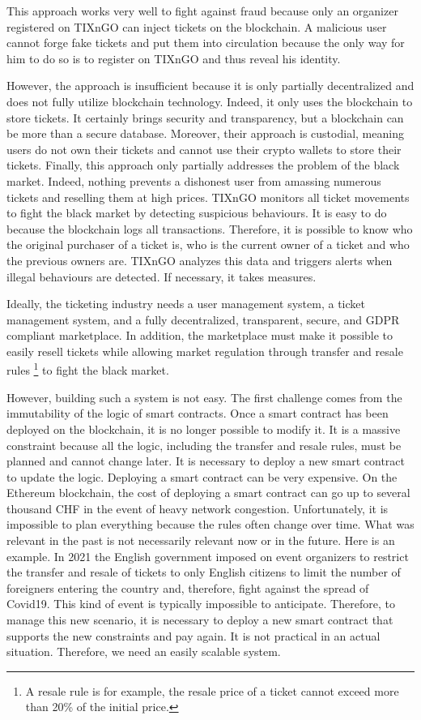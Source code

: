 \documentclass[a4paper,11pt,oneside]{report}
\begin{document}
This approach works very well to fight against fraud because only an organizer registered on TIXnGO can inject tickets on the blockchain. A malicious user cannot forge fake tickets and put them into circulation because the only way for him to do so is to register on TIXnGO and thus reveal his identity.

However, the approach is insufficient because it is only partially decentralized and does not fully utilize blockchain technology. Indeed, it only uses the blockchain to store tickets. It certainly brings security and transparency, but a blockchain can be more than a secure database. Moreover, their approach is custodial, meaning users do not own their tickets and cannot use their crypto wallets to store their tickets. Finally, this approach only partially addresses the problem of the black market. Indeed, nothing prevents a dishonest user from amassing numerous tickets and reselling them at high prices. TIXnGO monitors all ticket movements to fight the black market by detecting suspicious behaviours. It is easy to do because the blockchain logs all transactions. Therefore, it is possible to know who the original purchaser of a ticket is, who is the current owner of a ticket and who the previous owners are. TIXnGO analyzes this data and triggers alerts when illegal behaviours are detected. If necessary, it takes measures.

Ideally, the ticketing industry needs a user management system, a ticket management system, and a fully decentralized, transparent, secure, and GDPR compliant marketplace. In addition, the marketplace must make it possible to easily resell tickets while allowing market regulation through transfer and resale rules \footnote{A resale rule is for example, the resale price of a ticket cannot exceed more than 20\% of the initial price.} to fight the black market.

However, building such a system is not easy. The first challenge comes from the immutability of the logic of smart contracts. Once a smart contract has been deployed on the blockchain, it is no longer possible to modify it. It is a massive constraint because all the logic, including the transfer and resale rules, must be planned and cannot change later. It is necessary to deploy a new smart contract to update the logic. Deploying a smart contract can be very expensive. On the Ethereum blockchain, the cost of deploying a smart contract can go up to several thousand CHF in the event of heavy network congestion. Unfortunately, it is impossible to plan everything because the rules often change over time. What was relevant in the past is not necessarily relevant now or in the future. Here is an example. In 2021 the English government imposed on event organizers to restrict the transfer and resale of tickets to only English citizens to limit the number of foreigners entering the country and, therefore, fight against the spread of Covid19. This kind of event is typically impossible to anticipate. Therefore, to manage this new scenario, it is necessary to deploy a new smart contract that supports the new constraints and pay again. It is not practical in an actual situation. Therefore, we need an easily scalable system.
\end{document}
